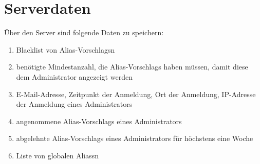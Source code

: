 \section{Serverdaten}

Über den Server sind folgende Daten zu speichern:
\begin{enumerate}[label=\textbf{/D\arabic*0/}, align=left, resume]
	\item Blacklist von \Glspl{Alias-Vorschlag}n
	\item benötigte Mindestanzahl, die \Glspl{Alias-Vorschlag} haben müssen, damit diese dem Administrator angezeigt werden
	\item E-Mail-Adresse, Zeitpunkt der Anmeldung, Ort der Anmeldung, IP-Adresse der Anmeldung eines Administrators
	\item angenommene \Glspl{Alias-Vorschlag} eines Administrators
	\item abgelehnte \Glspl{Alias-Vorschlag} eines Administrators für höchstens eine Woche
	\item Liste von globalen \Glspl{Alias}n
\end{enumerate}